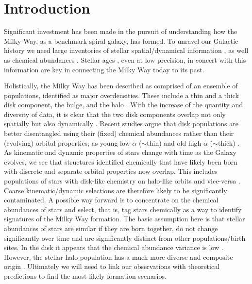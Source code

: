 \documentclass[fleqn,usenatbib]{mnras}
\begin{document}



\section{Introduction} \label{sec:introduction}

Significant investment has been made in the pursuit of understanding how the Milky Way, as a benchmark spiral galaxy, has formed. To unravel our Galactic history we need large inventories of stellar spatial/dynamical information \citep[e.g.][]{Brown2021}, as well as chemical abundances \citep{Jofre2019}. Stellar ages \citep{Soderblom2010}, even at low precision, in concert with this information are key in connecting the Milky Way today to its past.

Holistically, the Milky Way has been described as comprised of an ensemble of populations, identified as major overdensities. These include a thin and a thick disk component, the bulge, and the halo \citep[see e.g.][for a review]{BlandHawthorn_Gerhard2016}. With the increase of the quantity and diversity of data, it is clear that the two disk components overlap not only spatially but also dynamically \citep[e.g.][]{Bovy2012b}. Recent studies argue that disk populations are better disentangled using their (fixed) chemical abundances rather than their (evolving) orbital properties; as young low-$\alpha$ ($\sim$thin) and old high-$\alpha$ ($\sim$thick) \citep[e.g.][]{Bensby2014, Buder2019, BlandHawthorn2019}. As kinematic and dynamic properties of stars change with time as the Galaxy evolves, we see that structures identified chemically that have likely been born with discrete and separate orbital properties now overlap. This includes populations of stars with disk-like chemistry on halo-like orbits and vice-versa \citep[e.g.][]{Belokurov2020, Sestito2020}. Coarse kinematic/dynamic selections are therefore likely to be significantly contaminated. A possible way forward is to concentrate on the chemical abundances of stars and select, that is, tag stars chemically \citep[see e.g.][for a review on chemical tagging]{FreemanBlandHawthorn2002} as a way to identify signatures of the Milky Way formation. The basic assumption here is that stellar abundances of stars are similar if they are born together, do not change significantly over time and are significantly distinct from other populations/birth sites. In the disk it appears that the chemical abundance variance is low \citep{Bovy2016b, Ness2018, Ness2019b}. However, the stellar halo population has a much more diverse and composite origin \citep[e.g.][]{Helmi2020, Naidu2020}. Ultimately we will need to link our observations with theoretical predictions to find the most likely formation scenarios. 
\end{document}

